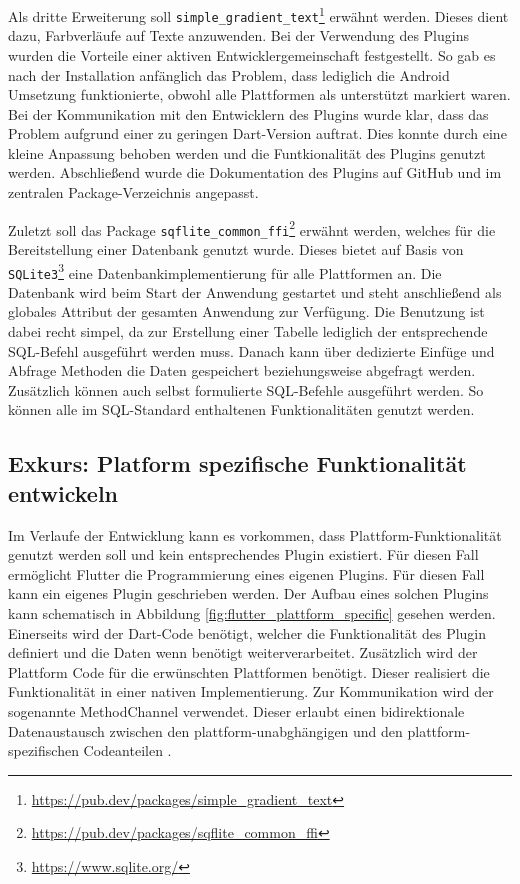 Als dritte Erweiterung soll \verb|simple_gradient_text|\footnote{\url{https://pub.dev/packages/simple\_gradient\_text}} erwähnt werden. Dieses dient dazu, Farbverläufe auf Texte anzuwenden. Bei der Verwendung des Plugins wurden die Vorteile einer aktiven Entwicklergemeinschaft festgestellt. So gab es nach der Installation anfänglich das Problem, dass lediglich die Android Umsetzung funktionierte, obwohl alle Plattformen als unterstützt markiert waren. Bei der Kommunikation mit den Entwicklern des Plugins wurde klar, dass das Problem aufgrund einer zu geringen Dart-Version auftrat. Dies konnte durch eine kleine Anpassung behoben werden und die Funtkionalität des Plugins genutzt werden. Abschließend wurde die Dokumentation des Plugins auf GitHub und im zentralen Package-Verzeichnis angepasst.

Zuletzt soll das Package \verb|sqflite_common_ffi|\footnote{\url{https://pub.dev/packages/sqflite\_common\_ffi}} erwähnt werden, welches für die Bereitstellung einer Datenbank genutzt wurde. Dieses bietet auf Basis von \verb|SQLite3|\footnote{\url{https://www.sqlite.org/}} eine Datenbankimplementierung für alle Plattformen an.
Die Datenbank wird beim Start der Anwendung gestartet und steht anschließend als globales Attribut der gesamten Anwendung zur Verfügung.
Die Benutzung ist dabei recht simpel, da zur Erstellung einer Tabelle lediglich der entsprechende SQL-Befehl ausgeführt werden muss.
Danach kann über dedizierte Einfüge und Abfrage Methoden die Daten gespeichert beziehungsweise abgefragt werden.
Zusätzlich können auch selbst formulierte SQL-Befehle ausgeführt werden. So können alle im SQL-Standard enthaltenen Funktionalitäten genutzt werden.


\subsection{Exkurs: Platform spezifische Funktionalität entwickeln}
Im Verlaufe der Entwicklung kann es vorkommen, dass Plattform-Funktionalität genutzt werden soll und kein entsprechendes Plugin existiert.
Für diesen Fall ermöglicht Flutter die Programmierung eines eigenen Plugins.
Für diesen Fall kann ein eigenes Plugin geschrieben werden. 
Der Aufbau eines solchen Plugins kann schematisch in Abbildung \ref{fig:flutter_plattform_specific} gesehen werden. 
Einerseits wird der Dart-Code benötigt, welcher die Funktionalität des Plugin definiert und die Daten wenn benötigt weiterverarbeitet. 
Zusätzlich wird der Plattform Code für die erwünschten Plattformen benötigt. Dieser realisiert die Funktionalität in einer nativen Implementierung.
Zur Kommunikation wird der sogenannte MethodChannel verwendet. Dieser erlaubt einen bidirektionale Datenaustausch zwischen den plattform-unabghängigen und den plattform-spezifischen Codeanteilen \cite[Kapitel~12.3]{Flutter_Recipes}.

